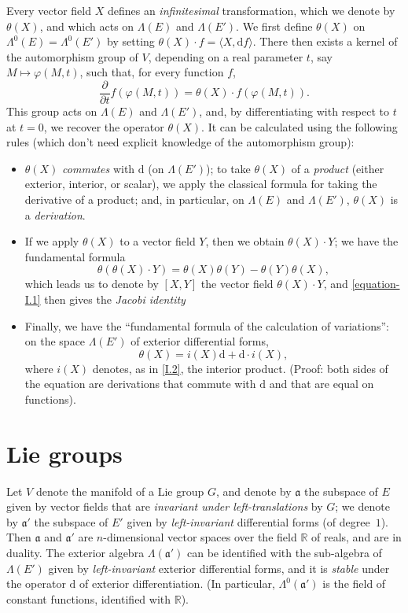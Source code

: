 \documentclass{article}
\newcommand{\dd}{\mathrm{d}}
\newcommand{\RR}{\mathbb{R}}
\newcommand{\fk}{\mathfrak}
\newcommand{\oldpage}[1]{\marginpar{\footnotesize$\Big\vert$ \textit{p.~#1}}}
\begin{document}
Every vector field $X$ defines an \emph{infinitesimal} transformation, which we denote by $\theta(X)$, and which acts on $\Lambda(E)$ and $\Lambda(E')$.
We first define $\theta(X)$ on $\Lambda^0(E)=\Lambda^0(E')$ by setting $\theta(X)\cdot f=\langle X,\dd f\rangle$.
There then exists a kernel of the automorphism group of $V$, depending on a real parameter $t$, say $M\mapsto\varphi(M,t)$, such that, for every function $f$,
\[
  \frac{\partial}{\partial t} f(\varphi(M,t))
  = \theta(X)\cdot f(\varphi(M,t)).
\]
This group acts on $\Lambda(E)$ and $\Lambda(E')$, and, by differentiating with respect to $t$ at $t=0$, we recover the operator $\theta(X)$.
It can be calculated using the following rules (which don't need explicit knowledge of the automorphism group):
\begin{itemize}
  \item $\theta(X)$ \emph{commutes} with $\dd$ (on $\Lambda(E')$); to take $\theta(X)$ of a \emph{product} (either exterior, interior, or scalar), we apply the classical formula for taking the derivative of a product; and, in particular, on $\Lambda(E)$ and $\Lambda(E')$, $\theta(X)$ is a \emph{derivation}.
  \item If we apply $\theta(X)$ to a vector field $Y$, then we obtain $\theta(X)\cdot Y$; we have the fundamental formula
    \[
    \label{equation-I.1}
      \theta(\theta(X)\cdot Y) = \theta(X)\theta(Y) - \theta(Y)\theta(X),
    \tag{1}
    \]
    which leads us to denote by $[X,Y]$ the vector field $\theta(X)\cdot Y$, and \cref{equation-I.1} then gives the \emph{Jacobi identity}
\oldpage{10}
  \item Finally, we have the ``fundamental formula of the calculation of variations'':
    on the space $\Lambda(E')$ of exterior differential forms,
    \[
    \label{equation-I.2}
      \theta(X) = i(X)\dd + \dd\cdot i(X),
    \tag{2}
    \]
    where $i(X)$ denotes, as in \cref{I.2}, the interior product.
    (Proof: both sides of the equation are derivations that commute with $\dd$ and that are equal on functions).
\end{itemize}


\section{Lie groups}
\label{I.5}

Let $V$ denote the manifold of a Lie group $G$, and denote by $\fk{a}$ the subspace of $E$ given by vector fields that are \emph{invariant under left-translations} by $G$;
we denote by $\fk{a}'$ the subspace of $E'$ given by \emph{left-invariant} differential forms (of degree~$1$).
Then $\fk{a}$ and $\fk{a}'$ are $n$-dimensional vector spaces over the field $\RR$ of reals, and are in duality.
The exterior algebra $\Lambda(\fk{a}')$ can be identified with the sub-algebra of $\Lambda(E')$ given by \emph{left-invariant} exterior differential forms, and it is \emph{stable} under the operator $\dd$ of exterior differentiation.
(In particular, $\Lambda^0(\fk{a}')$ is the field of constant functions, identified with $\RR$).
\end{document}
